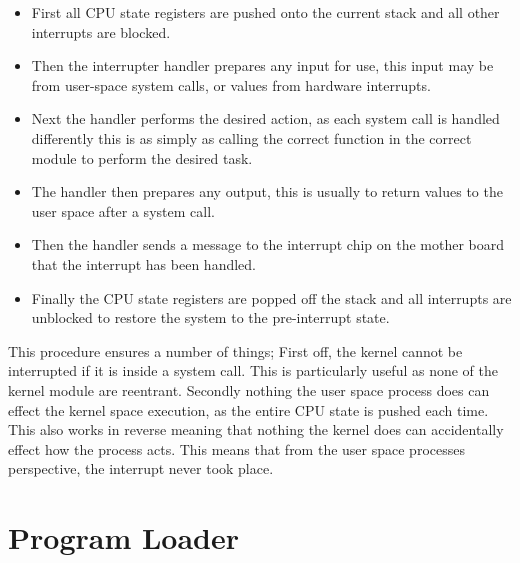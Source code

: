 \documentclass[a4paper]{report}
\begin{document}
\begin{itemize}

\item First all CPU state registers are pushed onto the current stack and all other interrupts are blocked.

\item Then the interrupter handler prepares any input for use, this input may be from user-space system calls, or values from hardware interrupts.

\item Next the handler performs the desired action, as each system call is handled differently this is as simply as calling the correct function in the correct module to perform the desired task.

\item The handler then prepares any output, this is usually to return values to the user space after a system call.

\item Then the handler sends a message to the interrupt chip on the mother board that the interrupt has been handled.

\item Finally the CPU state registers are popped off the stack and all interrupts are unblocked to restore the system to the pre-interrupt state.

\end{itemize}

This procedure ensures a number of things; First off, the kernel cannot be interrupted if it is inside a system call. This is particularly useful as none of the kernel module are reentrant. Secondly nothing the user space process does can effect the kernel space execution, as the entire CPU state is pushed each time. This also works in reverse meaning that nothing the kernel does can accidentally effect how the process acts. This means that from the user space processes perspective, the interrupt never took place.

















\section{Program Loader}
\end{document}
